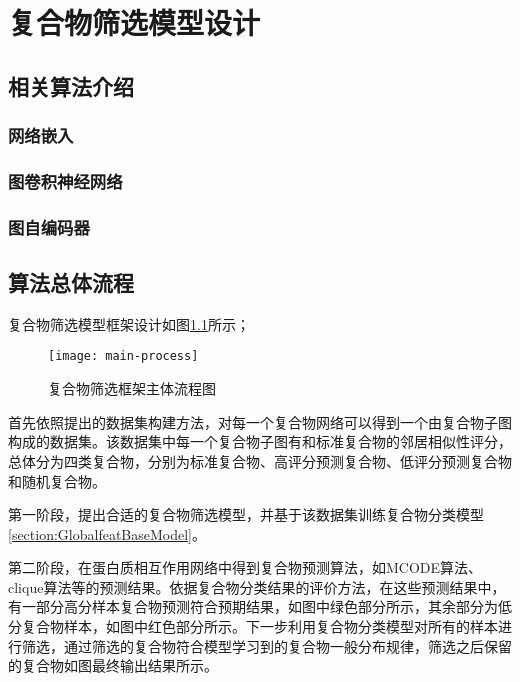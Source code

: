 \chapter{复合物筛选模型设计}
\label{chapter:gcnfilter}

\section{相关算法介绍}
\label{section:arithmetic}
\subsection{网络嵌入}
\label{subsection:nodeEmbedding}
\subsection{图卷积神经网络}
\label{subsection:GCN}
\subsection{图自编码器}
\label{subsection:GAE}
\section{算法总体流程}
\label{section:progress}

复合物筛选模型框架设计如图\ref{fig:main-process}所示；

\begin{figure}[htbp]
    \centering
    \texttt{[image: main-process]}
    \caption{复合物筛选框架主体流程图}
    \label{fig:main-process}
\end{figure}

首先依照\label{section:datasetExtract}提出的数据集构建方法，对每一个复合物网络可以得到一个由复合物子图构成的数据集。该数据集中每一个复合物子图有和标准复合物的邻居相似性评分，总体分为四类复合物，分别为标准复合物、高评分预测复合物、低评分预测复合物和随机复合物。

第一阶段，提出合适的复合物筛选模型，并基于该数据集训练复合物分类模型\ref{section:GlobalfeatBaseModel}。

第二阶段，在蛋白质相互作用网络中得到复合物预测算法，如MCODE算法、clique算法等的预测结果。依据复合物分类结果的评价方法，在这些预测结果中，有一部分高分样本复合物预测符合预期结果，如图中绿色部分所示，其余部分为低分复合物样本，如图中红色部分所示。下一步利用复合物分类模型对所有的样本进行筛选，通过筛选的复合物符合模型学习到的复合物一般分布规律，筛选之后保留的复合物如图最终输出结果所示。

